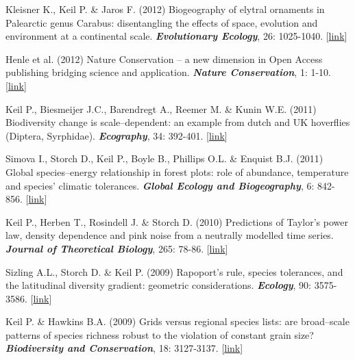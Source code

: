 \begin{etaremune}
\item Kleisner K., Keil P. \& Jaros F. (2012) Biogeography of elytral ornaments in Palearctic genus Carabus: disentangling the effects of space, evolution and environment at a continental scale. \textit{\textbf{Evolutionary Ecology}}, 26: 1025-1040. [\href{http://link.springer.com/article/10.1007%2Fs10682-011-9537-z}{link}]

\item Henle et al. (2012) Nature Conservation -- a new dimension in Open Access publishing bridging science and application. \textit{\textbf{Nature Conservation}}, 1: 1-10. [\href{http://www.pensoft.net/journals/natureconservation/article/3081/abstract/}{link}]

\item Keil P., Biesmeijer J.C., Barendregt A., Reemer M. \& Kunin W.E. (2011) Biodiversity change is scale--dependent: an example from dutch and UK hoverflies (Diptera, Syrphidae). \textit{\textbf{Ecography}}, 34: 392-401. [\href{http://onlinelibrary.wiley.com/doi/10.1111/j.1600-0587.2010.06554.x/abstract}{link}]

\item Simova I., Storch D., Keil P., Boyle B., Phillips O.L. \& Enquist B.J. (2011) Global species--energy relationship in forest plots: role of abundance, temperature and species' climatic tolerances. \textit{\textbf{Global Ecology and Biogeography}}, 6: 842-856. [\href{http://onlinelibrary.wiley.com/doi/10.1111/j.1466-8238.2011.00650.x/abstract}{link}] 

\item Keil P., Herben T., Rosindell J. \& Storch D. (2010) Predictions of Taylor's power law, density dependence and pink noise from a neutrally modelled time series. \textit{\textbf{Journal of Theoretical Biology}}, 265: 78-86. [\href{http://www.sciencedirect.com/science/article/pii/S0022519310001979}{link}]

\item Sizling A.L., Storch D. \& Keil P. (2009) Rapoport's rule, species tolerances, and the latitudinal diversity gradient: geometric considerations. \textit{\textbf{Ecology}}, 90: 3575-3586. [\href{http://www.esajournals.org/doi/abs/10.1890/08-1129.1?journalCode=ecol}{link}]

\item Keil P. \& Hawkins B.A. (2009) Grids versus regional species lists: are broad--scale patterns of species richness robust to the violation of constant grain size? \textit{\textbf{Biodiversity and Conservation}}, 18: 3127-3137. [\href{http://link.springer.com/article/10.1007%2Fs10531-009-9631-5}{link}]


\end{etaremune}
